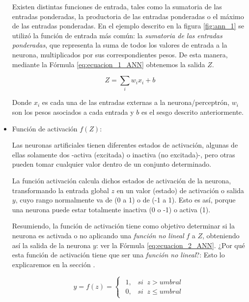 \documentclass[12pt,a4paper]{article}
\begin{document}
\begin{sloppypar}
\begin{itemize}
Existen distintas funciones de entrada, tales como la sumatoria de las entradas ponderadas, la productoria de las entradas ponderadas o el máximo de las entradas ponderadas\cite{ANN_23}. En el ejemplo descrito en la figura \ref{fig:ann_1} se utilizó la función de entrada más común: la \textit{sumatoria de las entradas ponderadas}, que representa la suma de todos los valores de entrada a la neurona, multiplicados por sus correspondientes pesos. De esta manera, mediante la Fórmula \ref{eq:ecuacion_1_ANN} obtenemos la salida $Z$.

\begin{equation}\label{eq:ecuacion_1_ANN}
Z=\sum_{i}w_{i}x_{i}+b
\end{equation}

Donde $x_i$ es cada una de las entradas externas a la neurona/perceptrón, $w_i$ son los pesos asociados a cada entrada y $b$ es el sesgo descrito anteriormente. 

\item Función de activación $f(Z)$:

Las neuronas artificiales tienen diferentes estados de activación, algunas de ellas solamente dos -activa (excitada) o inactiva (no excitada)-, pero otras pueden tomar cualquier valor dentro de un conjunto determinado.

La función activación calcula dichos estados de activación de la neurona, transformando la entrada global $z$ en un valor (estado) de activación o salida $y$, cuyo rango normalmente va de (0 a 1) o de (-1 a 1). Esto es así, porque una neurona puede estar totalmente inactiva (0 o -1) o activa (1)\cite{ANN_23}. 

Resumiendo, la función de activación tiene como objetivo determinar si la neurona es activada o no aplicando una \textit{función no lineal} $f$ a $Z$, obteniendo así la salida de la neurona $y$: ver la Fórmula \ref{eq:ecuacion_2_ANN}. ¿Por qué esta función de activación tiene que ser una \textit{función no lineal}?: Esto lo explicaremos en la sección \textit{}.

\begin{equation}\label{eq:ecuacion_2_ANN}
y = f(z) =  
\begin{cases}
\begin{array}{lr}
1, \;\;\;    si \;\; z > umbral \\
0, \;\;\;    si \;\; z \leq  umbral
\end{array}
\end{cases}
\end{equation}


\end{itemize}
\end{sloppypar}
\end{document}
